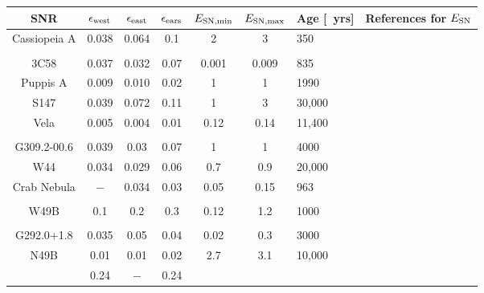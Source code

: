 \documentclass[12pt,preprint,a4paper]{aastex}
\def \yrs{~\rm{yrs}}
\begin{document}
\begin{table}[bp]
 \begin{tabular}{||c c c c c c l c ||}
 \hline
 SNR & $\epsilon_{\rm west}$ & $\epsilon_{\rm east}$ & $\epsilon_{\rm ears}$ &
 $E_{\rm SN,min}$ & $E_{\rm SN,max}$ & Age [\yrs] & References for $E_{\rm SN}$   \\ [0.5ex]
 \hline
 Cassiopeia A & 0.038 & 0.064  & 0.1 & 2 & 3 & 350 & \cite{LamingHwang2003} \\  
& & & & & & &   \cite{Orlandoetal2016}  \\ 
% 
 3C58 &  0.037 & 0.032 & 0.07 & 0.001 & 0.009 & 835 &  \cite{Bocchinoetal2001} \\
%
Puppis A &  0.009 & 0.010 & 0.02 & 1 & 1 & 1990 & \cite{WinklerPetre2007} \\
%
S147 &  0.039 & 0.072 & 0.11 & 1 & 3 & 30,000  & \cite{Katsutaetal2012} \\
%
Vela &  0.005 & 0.004 & 0.01 & 0.12 & 0.14 & 11,400 & \cite{Bocchinoetal1999} \\ 
& & & & & & &  \cite{Sushchetal2011}  \\
%
G309.2-00.6 &  0.039 & 0.03 & 0.07 & 1 & 1 & 4000 & \cite{Gaensleretal1998} \\
%
W44 &  0.034 & 0.029 &  0.06 & 0.7 & 0.9 & 20,000 & \cite{Harrusetal1997}  \\
%
Crab Nebula & $-$ & 0.034 & 0.03 & 0.05 & 0.15 & 963  & \cite{Kitauraetal2006} \\ 
& & & & & & &  \cite{YangChevalier2015}  \\
%
W49B  &0.1 &0.2  & 0.3 & 0.12 & 1.2 & 1000 & \cite{Micelietal2008} \\
& & & & & & &  \cite{Shimizuetal2013}  \\
%
G292.0+1.8 &0.035 &0.05  &0.04 & 0.02 & 0.3 & 3000 & \cite{Hughesetal1994} \\
%
N49B &0.01 &0.01 & 0.02  & 2.7 & 3.1 & 10,000 &\cite{Hughesetal1998} \\
     & 0.24 &$-$ & 0.24 &  & &  &     \\
 \hline
\end{tabular}
\centering

\end{table}
\end{document}

